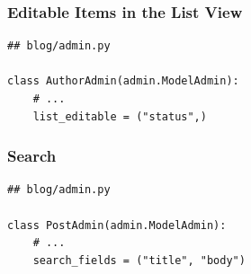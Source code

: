 \documentclass[aspectratio=169]{beamer}
\begin{document}
\begin{frame}[fragile]
\frametitle{Editable Items in the List View}

{\tiny
\begin{verbatim}
## blog/admin.py

class AuthorAdmin(admin.ModelAdmin):
    # ...
    list_editable = ("status",)
\end{verbatim}
} 
\end{frame}
\begin{frame}
\begin{figure}[p]
  \centering
\end{figure}

\end{frame}


\begin{frame}[fragile]
\frametitle{Search}

{\tiny
\begin{verbatim}
## blog/admin.py

class PostAdmin(admin.ModelAdmin):
    # ...
    search_fields = ("title", "body")
\end{verbatim}
} 
\end{frame}
\begin{frame}
\begin{figure}[p]
  \centering
\end{figure}

\end{frame}
\end{document}

